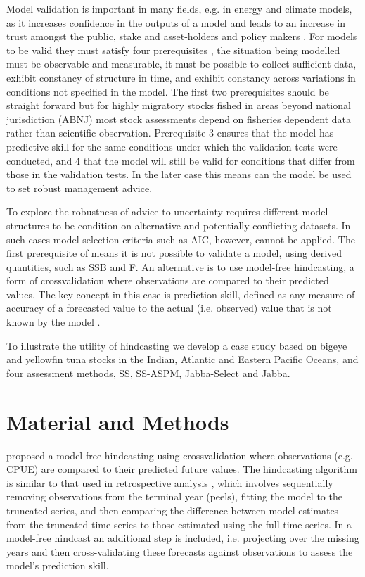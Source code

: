 \documentclass[a4paper]{article}
\begin{document}
Model validation is important in many fields, e.g. in energy and climate models, as it increases confidence in the outputs of a model and leads to an increase in trust amongst the public, stake and asset-holders and policy makers \citep{kellSubmitted}. For models to be valid they must satisfy four prerequisites \citep{hodge1992}, the situation being modelled must be observable and measurable, it must be possible to collect sufficient data, exhibit constancy of structure in time, and exhibit constancy across variations in conditions not specified in the model. The first two prerequisites should be straight forward but for highly migratory stocks fished in areas beyond national jurisdiction (ABNJ) most stock assessments depend on fisheries dependent data rather than scientific observation. Prerequisite 3 ensures that the model has predictive skill for the same conditions under which the validation tests were conducted, and 4 that the model will still be valid for conditions that differ from those in the validation tests. In the later case this means can the model be used to set robust management advice. 

To explore the robustness of advice to uncertainty requires different model structures to be condition on alternative and potentially conflicting datasets. In such cases model selection criteria such as AIC, however, cannot be applied. The first prerequisite of means it is not possible to validate a model, using derived quantities, such as SSB and F. An alternative is to use model-free hindcasting, a form of crossvalidation where observations are compared to their predicted values. The key concept in this case is prediction skill, defined as any measure of accuracy of a forecasted value to the actual (i.e. observed) value that is not known by the model \cite{Huschke1959}.

To illustrate the utility of hindcasting we develop a case study based on bigeye and yellowfin tuna stocks in the Indian, Atlantic and Eastern Pacific Oceans, and four assessment methods, SS, SS-ASPM, Jabba-Select and Jabba. 

\section{Material and Methods}

\cite{kell2016xval} proposed a model-free hindcasting using crossvalidation where observations (e.g. CPUE) are compared to their predicted future values. The hindcasting algorithm is similar to that used in retrospective analysis \citep{Hurtado2014, carvalho}, which involves sequentially removing  observations from the terminal year (peels), fitting the model to the truncated series, and then comparing the difference between model estimates from the truncated time-series to those estimated using the full time series. In a model-free hindcast an additional step is included, i.e. projecting over the missing years and then cross-validating these forecasts against observations to assess the model’s prediction skill.
\end{document}
